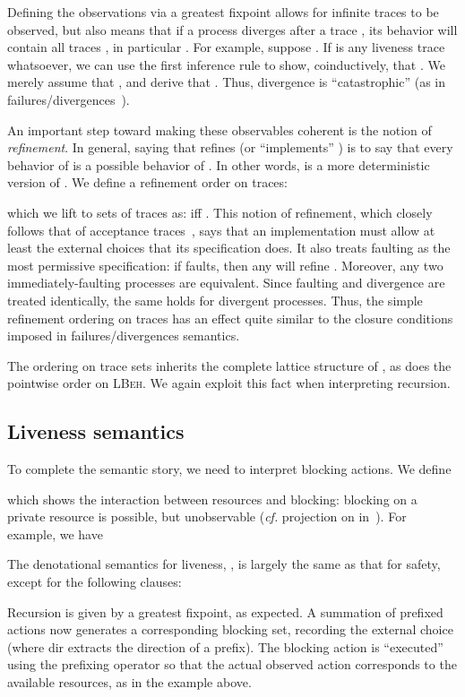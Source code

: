 \documentclass{entcs}
\begin{document}
Defining the observations via a greatest fixpoint allows for infinite
traces to be observed, but also means that if a process diverges after
a trace , its behavior will contain all traces , in particular
.  For example, suppose .  If
 is any liveness trace whatsoever, we can use the first inference
rule to show, coinductively, that .  We merely
assume that , and derive that .  Thus, divergence is ``catastrophic'' (as in
failures/divergences~\cite{Brookes1984}).

An important step toward making these observables coherent is the
notion of \emph{refinement}.  In general, saying that  refines 
(or  ``implements'' ) is to say that every behavior of  is a
possible behavior of .  In other words,  is a more deterministic
version of .  We define a refinement order on traces:

which we lift to sets of traces as:  iff .  This notion of refinement, which
closely follows that of acceptance traces~\cite{Hennessy2002}, says
that an implementation must allow at least the external choices that
its specification does.  It also treats faulting as the most
permissive specification: if  faults, then any  will refine .
Moreover, any two immediately-faulting processes are equivalent.
Since faulting and divergence are treated identically, the same holds
for divergent processes.  Thus, the simple refinement ordering on
traces has an effect quite similar to the closure conditions imposed
in failures/divergences semantics.

The ordering on trace sets inherits the complete lattice structure of
, as does the pointwise order on \textsc{LBeh}.
We again exploit this fact when interpreting recursion.

\subsection{Liveness semantics}

To complete the semantic story, we need to interpret blocking actions.
We define

which shows the interaction between resources and blocking: blocking
on a private resource is possible, but unobservable (\emph{cf.}
projection on  in~\cite{Brookes2002}).  For example, we have


The denotational semantics for liveness, , is largely the
same as that for safety, except for the following clauses:

Recursion is given by a greatest fixpoint, as expected. A summation of
prefixed actions now generates a corresponding blocking set, recording
the external choice (where dir extracts the direction of a prefix).
The blocking action is ``executed'' using the prefixing operator
 so that the actual observed action corresponds to the
available resources, as in the example above.
\end{document}
